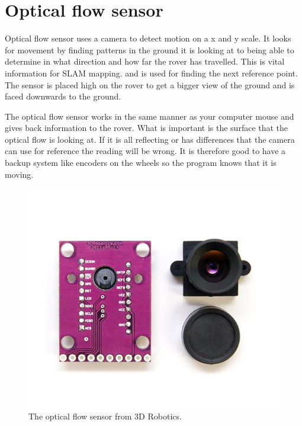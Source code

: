 \section{Optical flow sensor}

Optical flow sensor uses a camera to detect motion on a x and y scale. It looks for movement by finding patterns in the ground it is looking at to being able to determine in what direction and how far the rover has travelled. This is vital information for SLAM mapping. and is used for finding the next reference point. The sensor is placed high on the rover to get a bigger view of the ground and is faced downwards to the ground.

The optical flow sensor works in the same manner as your computer mouse and gives back information to the rover. What is important is the surface that the optical flow is looking at. If it is all reflecting or has differences that the camera can use for reference the reading will be wrong. It is therefore good to have a backup system like encoders on the wheels so the program knows that it is moving.


\begin{figure}[H]
	\centering
	\includegraphics[width=.3\linewidth]{images/optical.jpg}
	\caption{The optical flow sensor from 3D Robotics.}
\end{figure}


